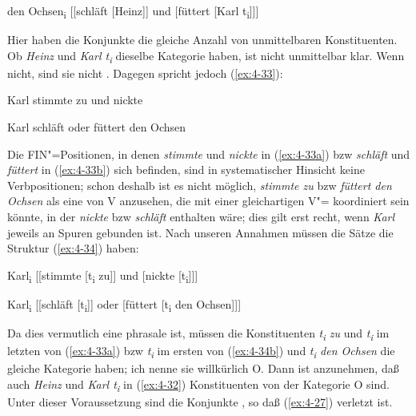 \documentclass[output=paper]{langsci/langscibook}
\begin{document}
\begin{exe}
\ex%
\label{ex:4-32}
den Ochsen\textsubscript{i} [[schläft [Heinz]] und [füttert [Karl t\textsubscript{i}]]]
\end{exe}
\addlines[-2]
Hier haben die Konjunkte die gleiche Anzahl von unmittelbaren Konstituenten. Ob \textit{Heinz} und \textit{Karl t\textsubscript{i}} dieselbe Kategorie haben, ist nicht unmittelbar klar. Wenn nicht, sind sie nicht . Dagegen spricht jedoch (\ref{ex:4-33}):

\begin{exe}
\ex
\label{ex:4-33}
\begin{xlist}
\ex%
\label{ex:4-33a}
Karl stimmte zu und nickte

\ex%
\label{ex:4-33b}
Karl schläft oder füttert den Ochsen
\end{xlist}
\end{exe}
Die FIN"=Positionen, in denen \textit{stimmte} und \textit{nickte} in (\ref{ex:4-33a}) bzw \textit{schläft} und \textit{füttert} in (\ref{ex:4-33b}) sich befinden, sind in systematischer Hinsicht keine Verbpositionen; schon deshalb ist es nicht möglich, \textit{stimmte zu} bzw \textit{füttert den Ochsen} als eine  von V anzusehen, die mit einer gleichartigen V"= koordiniert sein könnte, in der \textit{nickte} bzw \textit{schläft} enthalten wäre; dies gilt erst recht, wenn \textit{Karl} jeweils an Spuren gebunden ist. Nach unseren Annahmen müssen die Sätze die Struktur (\ref{ex:4-34}) haben:

\begin{exe}
\ex
\label{ex:4-34}
\begin{xlist}
\ex%
\label{ex:4-34a}
Karl\textsubscript{i} [[stimmte [t\textsubscript{i} zu]] und [nickte [t\textsubscript{i}]]]

\ex%
\label{ex:4-34b}
Karl\textsubscript{i} [[schläft [t\textsubscript{i}]] oder [füttert [t\textsubscript{i} den Ochsen]]]
\end{xlist}
\end{exe}
Da dies vermutlich eine phrasale  ist, müssen die Konstituenten \textit{t\textsubscript{i} zu} und \textit{t\textsubscript{i}} im letzten  von (\ref{ex:4-33a}) bzw \textit{t\textsubscript{i}} im ersten  von (\ref{ex:4-34b}) und \textit{t\textsubscript{i} den Ochsen} die gleiche Kategorie haben; ich nenne sie willkürlich O. Dann ist anzunehmen, daß auch \textit{Heinz} und \textit{Karl t\textsubscript{i}} in (\ref{ex:4-32}) Konstituenten von der Kategorie O sind. Unter dieser Voraussetzung sind die Konjunkte , so daß (\ref{ex:4-27}) verletzt ist.
\end{document}
